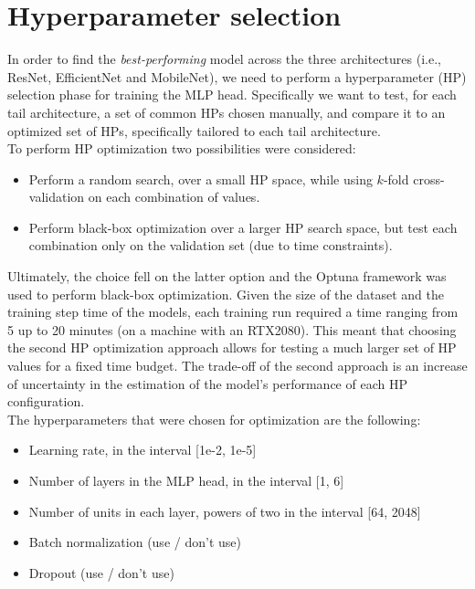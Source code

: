 
\section{Hyperparameter selection} %
In order to find the \textit{best-performing} model across the three architectures (i.e., ResNet, EfficientNet and MobileNet), we need to perform a hyperparameter (HP) selection phase for training the MLP head. Specifically we want to test, for each tail architecture, a set of common HPs chosen manually, and compare it to an optimized set of HPs, specifically tailored to each tail architecture.\\

\noindent
To perform HP optimization two possibilities were considered:

\begin{itemize}
    \item Perform a random search, over a small HP space, while using $k$-fold cross-validation on each combination of values.
    \item Perform black-box optimization over a larger HP search space, but test each combination only on the validation set (due to time constraints).
\end{itemize}

\noindent
Ultimately, the choice fell on the latter option and the Optuna \cite{akiba2019optuna} framework was used to perform black-box optimization. Given the size of the dataset and the training step time of the models, each training run required a time ranging from 5 up to 20 minutes (on a machine with an RTX2080). This meant that choosing the second HP optimization approach allows for testing a much larger set of HP values for a fixed time budget. The trade-off of the second approach is an increase of uncertainty in the estimation of the model's performance of each HP configuration.\\

\noindent
The hyperparameters that were chosen for optimization are the following:
\begin{itemize}
    \item Learning rate, in the interval [1e-2, 1e-5]
    \item Number of layers in the MLP head, in the interval [1, 6]
    \item Number of units in each layer, powers of two in the interval [64, 2048] 
    \item Batch normalization (use / don't use)
    \item Dropout (use / don't use)
\end{itemize}

